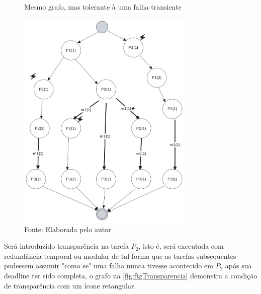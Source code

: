 \begin{figure}[H]
    \centering
	\captionsetup{justification=centering}
    \caption{Mesmo grafo, mas tolerante à uma falha transiente}
    \includegraphics[width=0.75\textwidth]{assets/ftg_expandido.png}
	\captionsetup{justification=raggedright}
    \caption*{Fonte: Elaborada pelo autor}
    \label{fig:ftgExpandido}
\end{figure}

Será introduzido transparência na tarefa $P_2$, isto é, será executada com redundância temporal ou modular de tal forma que as tarefas subsequentes pudessem assumir "como se" uma falha nunca tivesse acontecido em $P_2$ após sua deadline ter sido completa, o grafo na \autoref{fig:ftgTransparencia} demonstra a condição de transparência com um ícone retangular.


